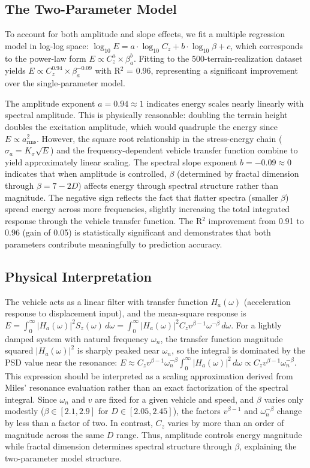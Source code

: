 \documentclass[11pt,letterpaper]{article}
\begin{document}
\subsection{The Two-Parameter Model}

To account for both amplitude and slope effects, we fit a multiple regression model in log-log space: $\log_{10} E = a \cdot \log_{10} C_z + b \cdot \log_{10} \beta + c$, which corresponds to the power-law form $E \propto C_z^a \times \beta_a^b$. Fitting to the 500-terrain-realization dataset yields $E \propto C_z^{0.94} \times \beta_a^{-0.09}$ with R$^2$ = 0.96, representing a significant improvement over the single-parameter model.

The amplitude exponent $a = 0.94 \approx 1$ indicates energy scales nearly linearly with spectral amplitude. This is physically reasonable: doubling the terrain height doubles the excitation amplitude, which would quadruple the energy since $E \propto a_{\text{rms}}^2$. However, the square root relationship in the stress-energy chain ($\sigma_a = K_\sigma \sqrt{E}$) and the frequency-dependent vehicle transfer function combine to yield approximately linear scaling. The spectral slope exponent $b = -0.09 \approx 0$ indicates that when amplitude is controlled, $\beta$ (determined by fractal dimension through $\beta = 7-2D$) affects energy through spectral structure rather than magnitude. The negative sign reflects the fact that flatter spectra (smaller $\beta$) spread energy across more frequencies, slightly increasing the total integrated response through the vehicle transfer function. The R$^2$ improvement from 0.91 to 0.96 (gain of 0.05) is statistically significant and demonstrates that both parameters contribute meaningfully to prediction accuracy.

\subsection{Physical Interpretation}

The vehicle acts as a linear filter with transfer function $H_a(\omega)$ (acceleration response to displacement input), and the mean-square response is $E = \int_0^\infty |H_a(\omega)|^2 S_z(\omega) \, d\omega = \int_0^\infty |H_a(\omega)|^2 C_z v^{\beta-1} \omega^{-\beta} \, d\omega$. For a lightly damped system with natural frequency $\omega_n$, the transfer function magnitude squared $|H_a(\omega)|^2$ is sharply peaked near $\omega_n$, so the integral is dominated by the PSD value near the resonance: $E \approx C_z v^{\beta-1} \omega_n^{-\beta} \int_0^\infty |H_a(\omega)|^2 \, d\omega \propto C_z v^{\beta-1} \omega_n^{-\beta}$. This expression should be interpreted as a scaling approximation derived from Miles' resonance evaluation rather than an exact factorization of the spectral integral. Since $\omega_n$ and $v$ are fixed for a given vehicle and speed, and $\beta$ varies only modestly ($\beta \in [2.1, 2.9]$ for $D \in [2.05, 2.45]$), the factors $v^{\beta-1}$ and $\omega_n^{-\beta}$ change by less than a factor of two. In contrast, $C_z$ varies by more than an order of magnitude across the same $D$ range. Thus, amplitude controls energy magnitude while fractal dimension determines spectral structure through $\beta$, explaining the two-parameter model structure.
\end{document}
